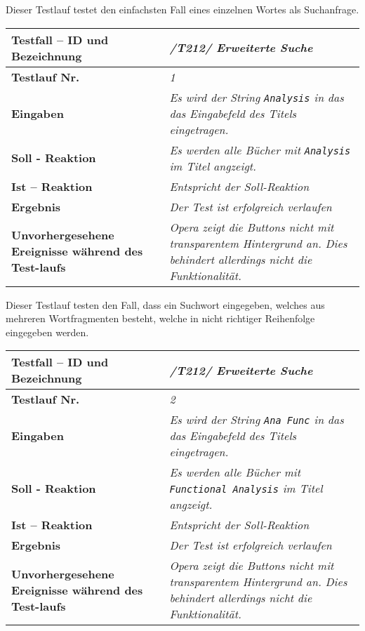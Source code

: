 Dieser Testlauf testet den einfachsten Fall eines einzelnen Wortes als
Suchanfrage.

\begin{longtable}{|p{5cm}|p{10cm}|}
\hline
\textbf{Testfall -- ID und Bezeichnung} & \textit{/T212/ Erweiterte
Suche} \\
\hline
\textbf{Testlauf Nr.} & \textit{1} \\
\hline
\textbf{Eingaben} & \textit{Es wird der String \lstinline{Analysis} in das
das Eingabefeld des Titels eingetragen.} \\
\hline
\textbf{Soll - Reaktion} & \textit{Es werden alle Bücher mit
\lstinline{Analysis} im Titel angzeigt.
} \\
\hline
\textbf{Ist -- Reaktion} & \textit{Entspricht der Soll-Reaktion} \\
\hline
\textbf{Ergebnis} & \textit{Der Test ist erfolgreich verlaufen} \\
\hline
\textbf{Unvorhergesehene Ereignisse w\"ahrend des Test-laufs } &
\textit{Opera zeigt die Buttons nicht mit transparentem Hintergrund an. Dies
behindert allerdings nicht die Funktionalität.} \\
\hline
\end{longtable}

Dieser Testlauf testen den Fall, dass ein Suchwort eingegeben, welches aus
mehreren Wortfragmenten besteht, welche in nicht richtiger Reihenfolge
eingegeben werden.

\begin{longtable}{|p{5cm}|p{10cm}|}
\hline
\textbf{Testfall -- ID und Bezeichnung} & \textit{/T212/ Erweiterte
Suche} \\
\hline
\textbf{Testlauf Nr.} & \textit{2} \\
\hline
\textbf{Eingaben} & \textit{Es wird der String \lstinline{Ana Func} in das
das Eingabefeld des Titels eingetragen.} \\
\hline
\textbf{Soll - Reaktion} & \textit{Es werden alle Bücher mit
\lstinline{Functional Analysis} im Titel angzeigt.
} \\
\hline
\textbf{Ist -- Reaktion} & \textit{Entspricht der Soll-Reaktion} \\
\hline
\textbf{Ergebnis} & \textit{Der Test ist erfolgreich verlaufen} \\
\hline
\textbf{Unvorhergesehene Ereignisse w\"ahrend des Test-laufs } &
\textit{Opera zeigt die Buttons nicht mit transparentem Hintergrund an. Dies
behindert allerdings nicht die Funktionalität.} \\
\hline
\end{longtable}

